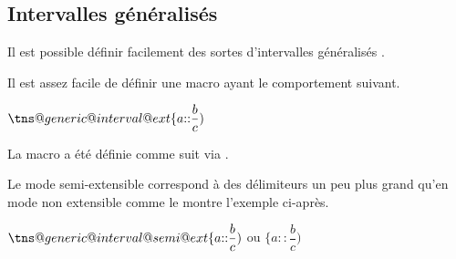 \documentclass[12pt,a4paper]{article}
\begin{document}

\subsection{Intervalles \og généralisés \fg}

Il est possible définir facilement des sortes d'intervalles \og généralisés \fg{}.





Il est assez facile de définir une macro ayant le comportement suivant.

\makeatletter
\newcommand\strangeset[2]{%
    \tns@generic@interval@ext{\{} %
                             {#1} %
                             {::} %
                             {#2} %
                             {)}  %
}
\makeatother

\begin{latexex}
$\strangeset{a}{\dfrac{b}{c}}$
\end{latexex}


La macro  a été définie comme suit via .

\begin{latexex-alone}
\newcommand\strangeset[2]{%
    \tns@generic@interval@ext{\{} %
                             {#1} %
                             {::} %
                             {#2} %
                             {)}  %
}
\end{latexex-alone}





Le mode semi-extensible correspond à des délimiteurs un peu plus grand qu'en mode non extensible comme le montre l'exemple ci-après.

\makeatletter
\newcommand\myinter[2]{%
    \tns@generic@interval@semi@ext{\{}%
                                  {#1}{::}{#2}%
                                  {)}%
}
\makeatother

\begin{latexex}
$\myinter{a}{\dfrac{b}{c}}$ ou
$\{ a :: \dfrac{b}{c} )$
\end{latexex}
\end{document}
